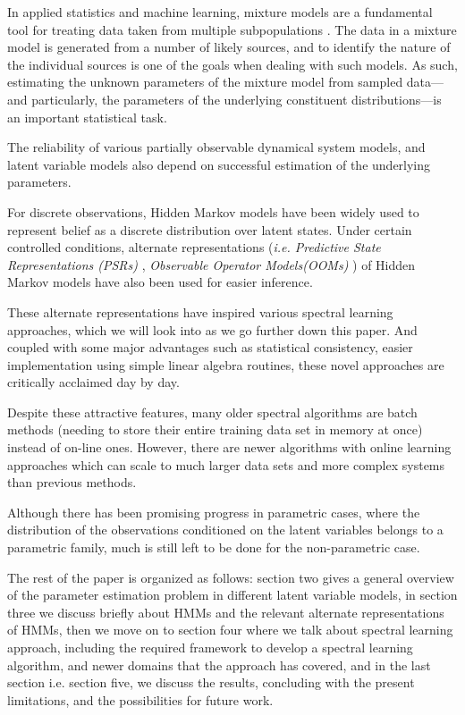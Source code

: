 In applied statistics and machine learning, mixture models are a fundamental tool for treating data taken from multiple subpopulations \cite{ref3}. The data in a mixture model is generated from a number of likely sources, and to identify the nature of the individual sources is one of the goals when dealing with such models. As such, estimating the unknown parameters of the mixture model from sampled data—and particularly, the parameters of the underlying constituent distributions—is an important statistical task. 

The reliability of various partially observable dynamical system models, and latent variable models also depend on successful estimation of the underlying parameters.

For discrete observations, Hidden Markov models have been widely used to represent belief as a discrete distribution over latent states. Under certain controlled conditions, alternate representations (\textit{i.e. Predictive State Representations (PSRs)} \cite{ref30}, \textit{Observable Operator Models(OOMs)} \cite{ref9} ) of Hidden Markov models have also been used for easier inference.

These alternate representations have inspired various spectral learning approaches, which we will look into as we go further down this paper. And coupled with some major advantages such as statistical consistency, easier implementation using simple linear algebra routines, these novel approaches are critically acclaimed day by day. 

Despite these attractive features, many older spectral algorithms are batch methods (needing to store their entire training data set in memory at once) instead of on-line ones.\cite{ref31} However, there are newer algorithms with online learning approaches which can scale to much larger data sets and more complex systems than previous methods.

Although there has been promising progress in parametric cases, where the distribution of the observations conditioned on the latent variables belongs to a parametric family, much is still left to be done for the non-parametric case. 

The rest of the paper is organized as follows: section two gives a general overview of the parameter estimation problem in different latent variable models, in section three we discuss briefly about HMMs and the relevant alternate representations of HMMs, then we move on to section four where we talk about spectral learning approach, including the required framework to develop a spectral learning algorithm, and newer domains that the approach has covered, and in the last section i.e. section five, we discuss the results, concluding with the present limitations, and the possibilities for future work.   


